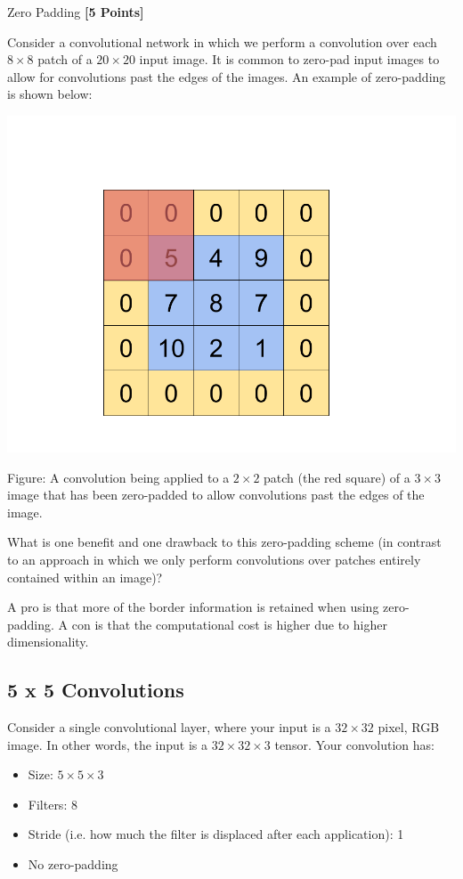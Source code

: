  \problem Zero Padding \textbf{[5 Points]}

 Consider a convolutional network in which we perform a convolution over each $8 \times 8$ patch of a $20 \times 20$ input image. It is common to zero-pad input images to allow for convolutions past the edges of the images. An example of zero-padding is shown below:

\begin{center}
  \includegraphics[width=.49\textwidth]{Plots/ConvolutionExample.png}
\end{center}
\begin{small}
Figure: A convolution being applied to a $2 \times 2$ patch (the red square) of a $3 \times 3$ image that has been zero-padded to allow convolutions past the edges of the image.
\end{small}

What is one benefit and one drawback to this zero-padding scheme (in contrast to an approach in which we only perform convolutions over patches entirely contained within an image)?

\begin{solution}
  A pro is that more of the border information is retained when using zero-padding. A con is that the computational cost is higher due to higher dimensionality.
\end{solution}

\subsection{5 x 5 Convolutions}

Consider a single convolutional layer, where your input is a $32 \times 32$ pixel, RGB image. In other words, the input is a $32 \times 32 \times 3$ tensor. Your convolution has:

\begin{itemize}
\item Size: $5 \times 5 \times 3$
\item Filters: 8
\item Stride (i.e. how much the filter is displaced after each application): 1
\item No zero-padding
\end{itemize}

